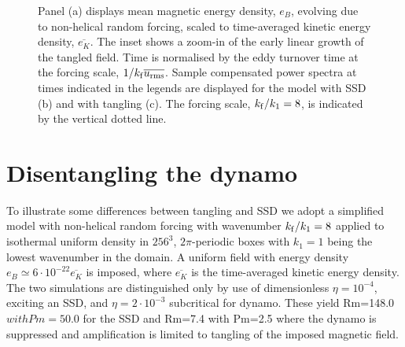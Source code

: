 \documentclass[preprint2]{aastex63}
\newcommand\kf{k_{\rm f} }
\begin{document}
\begin{figure*}
\caption{
Panel (a) displays mean magnetic energy density, $e_B$,
evolving due to non-helical random forcing, scaled to time-averaged kinetic
energy density, $\overline{e_K}$.
The inset shows a zoom-in of the early linear growth of the tangled field.
Time is normalised by the eddy turnover time at the forcing scale,
$1/\kf \overline{u_{\rm rms}}$.
Sample compensated power spectra at times indicated in the legends are
displayed for the model with SSD (b) and with tangling (c). 
The forcing scale, $\kf/k_1=8$, is indicated by the vertical dotted line.
\label{fig:tangling}}
\end{figure*}

\section{Disentangling the dynamo} \label{sec:ssd-tang}

To illustrate some differences between tangling and SSD we adopt a simplified
model with non-helical random forcing with wavenumber $\kf/k_1=8$ applied to
isothermal uniform density in $256^3$, $2\pi$-periodic boxes with $k_1=1$ being
the lowest wavenumber in the domain.
A uniform field with energy density $e_B\simeq6\cdot10^{-22}\overline{e_K}$ is
imposed, where $\overline{e_K}$ is the time-averaged kinetic energy density.
The two simulations are distinguished only by use of dimensionless
$\eta=10^{-4}$, exciting an SSD, and $\eta=2\cdot10^{-3}$
subcritical for dynamo.
These yield Rm=148.0$ with Pm=50.0$ for the SSD and Rm=7.4 with Pm=2.5 where
the dynamo is suppressed and amplification is limited to tangling of the
imposed magnetic field.
\end{document}
